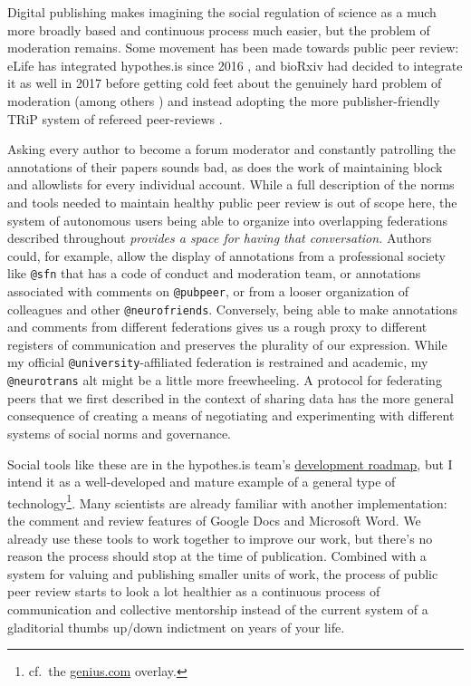 \documentclass[notoc]{tufte-book}
\begin{document}
Digital publishing makes imagining the social regulation of science as a
much more broadly based and continuous process much easier, but the
problem of moderation remains. Some movement has been made towards
public peer review: eLife has integrated hypothes.is since 2016 \citep{ELifePartnersHypothes2016} , and bioRxiv had decided to
integrate it as well in 2017 \citep{dwhlyBioRxivSelectsHypothesis2017}  before getting cold feet about the genuinely hard problem of
moderation (among others \citep{heatherstainesPreprintServicesGather2018} ) and instead adopting the
more publisher-friendly TRiP system of refereed peer-reviews \citep{nateangellAnnouncingTRiPTransparent2019} .

Asking every author to become a forum moderator and constantly
patrolling the annotations of their papers sounds bad, as does the work
of maintaining block and allowlists for every individual account. While
a full description of the norms and tools needed to maintain healthy
public peer review is out of scope here, the system of autonomous users
being able to organize into overlapping federations described throughout
\emph{provides a space for having that conversation.} Authors could, for
example, allow the display of annotations from a professional society
like \texttt{@sfn} that has a code of conduct and moderation team, or
annotations associated with comments on \texttt{@pubpeer}, or from a
looser organization of colleagues and other \texttt{@neurofriends}.
Conversely, being able to make annotations and comments from different
federations gives us a rough proxy to different registers of
communication and preserves the plurality of our expression. While my
official \texttt{@university}-affiliated federation is restrained and
academic, my \texttt{@neurotrans} alt might be a little more
freewheeling. A protocol for federating peers that we first described in
the context of sharing data has the more general consequence of creating
a means of negotiating and experimenting with different systems of
social norms and governance.

Social tools like these are in the hypothes.is team's
\href{https://web.archive.org/web/20211015213849/https://github.com/hypothesis/product-backlog/projects/6}{development
roadmap}, but I intend it as a well-developed and mature example of a
general type of technology\footnote{cf.~the
  \href{https://genius.com}{genius.com} overlay.}. Many scientists are
already familiar with another implementation: the comment and review
features of Google Docs and Microsoft Word. We already use these tools
to work together to improve our work, but there's no reason the process
should stop at the time of publication. Combined with a system for
valuing and publishing smaller units of work, the process of public peer
review starts to look a lot healthier as a continuous process of
communication and collective mentorship instead of the current system of
a gladitorial thumbs up/down indictment on years of your life.
\end{document}

